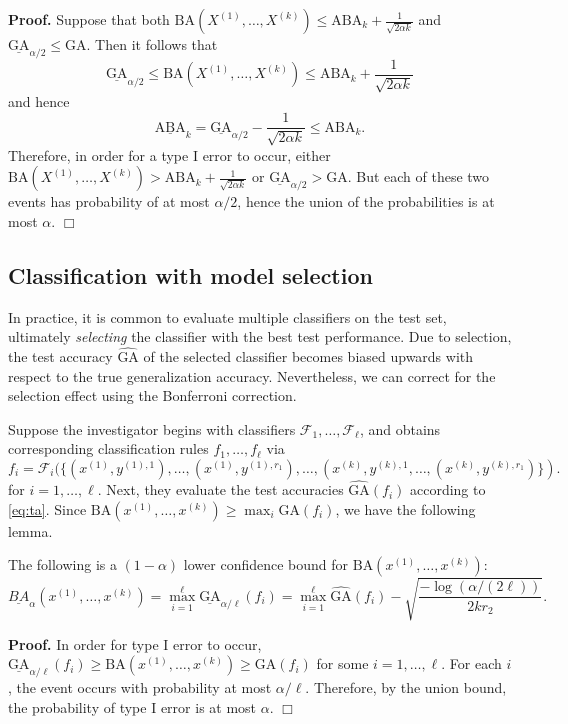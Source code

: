 \textbf{Proof.}
Suppose that both $\text{BA}(X^{(1)},\hdots,
X^{(k)}) \leq \text{ABA}_k + \frac{1}{\sqrt{2\alpha k}}$ and
$\underline{\text{GA}}_{\alpha/2} \leq \text{GA}.$
Then it follows that
\[
\underline{\text{GA}}_{\alpha/2} \leq \text{BA}(X^{(1)},\hdots,
X^{(k)}) \leq \text{ABA}_k + \frac{1}{\sqrt{2\alpha k}}
\]
and hence
\[
\underline{\text{ABA}}_k = \underline{\text{GA}}_{\alpha/2} -  \frac{1}{\sqrt{2\alpha k}} \leq \text{ABA}_k.
\]
Therefore, in order for a type I error to occur, either
$\text{BA}(X^{(1)},\hdots, X^{(k)}) > \text{ABA}_k
+ \frac{1}{\sqrt{2\alpha k}}$ or $\underline{\text{GA}}_{\alpha/2}
> \text{GA}.$ But each of these two events has probability of at most
$\alpha/2$, hence the union of the probabilities is at most
$\alpha$. $\Box$

\subsection{Classification with model selection}

In practice, it is common to evaluate multiple classifiers on the test
set, ultimately \emph{selecting} the classifier with the best test
performance.  Due to selection, the test accuracy
$\widehat{\text{GA}}$ of the selected classifier becomes biased
upwards with respect to the true generalization
accuracy. Nevertheless, we can correct for the selection effect using
the Bonferroni correction.

Suppose the investigator begins with classifiers
$\mathcal{F}_1,\hdots, \mathcal{F}_\ell$, and obtains corresponding
classification rules $f_1,\hdots, f_\ell$ via
\[
f_i = \mathcal{F}_i(\{(x^{(1)}, y^{(1),1}),\hdots, (x^{(1)},y^{(1),r_1}), \hdots, (x^{(k)}, y^{(k),1},\hdots, (x^{(k)},y^{(k), r_1})\}).
\]
for $i = 1,\hdots, \ell$.  Next, they evaluate the test accuracies
$\widehat{\text{GA}}(f_i)$ according to \eqref{eq:ta}.
Since $\text{BA}(x^{(1)},\hdots, x^{(k)}) \geq \max_i \text{GA}(f_i)$, we have the following lemma.

\begin{lemma}
The following is a $(1-\alpha)$ lower confidence bound for $\text{BA}(x^{(1)},\hdots, x^{(k)})$:
\[
\underline{BA}_\alpha(x^{(1)},\hdots, x^{(k)}) = \max_{i=1}^\ell \underline{\text{GA}}_{\alpha/\ell}(f_i) = \max_{i=1}^\ell \widehat{\text{GA}}(f_i) - \sqrt{\frac{-\log(\alpha/(2\ell))}{2kr_2}}.
\]
\end{lemma}

\textbf{Proof.}
In order for type I error to occur,
$\underline{\text{GA}}_{\alpha/\ell}(f_i) \geq \text{BA}(x^{(1)},\hdots,
x^{(k)}) \geq \text{GA}(f_i)$ for some $i = 1,\hdots, \ell$.  For each
$i$, the event occurs with probability at most $\alpha/\ell$.
Therefore, by the union bound, the probability of type I error is at
most $\alpha$.  $\Box$

